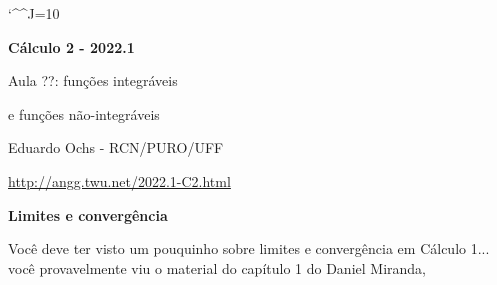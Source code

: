 \documentclass[oneside,12pt]{article}
\begin{document}
\catcode`\^^J=10
\pu
\def\pictgridstyle{\color{GrayPale}\linethickness{0.3pt}}
\def\pictaxesstyle{\linethickness{0.5pt}}


\def\u#1{\par{\footnotesize \url{#1}}}

\def\drafturl{http://angg.twu.net/LATEX/2022-1-C2.pdf}
\def\drafturl{http://angg.twu.net/2022.1-C2.html}
\def\draftfooter{\tiny \href{\drafturl}{\jobname{}} \ColorBrown{\shorttoday{} \hours}}



%

\thispagestyle{empty}

\begin{center}

\vspace*{1.2cm}

{\bf \Large Cálculo 2 - 2022.1}

\bsk

Aula ??: funções integráveis

e funções não-integráveis

\bsk

Eduardo Ochs - RCN/PURO/UFF

\url{http://angg.twu.net/2022.1-C2.html}

\end{center}

\newpage


{\bf Limites e convergência}

Você deve ter visto um pouquinho sobre limites e convergência em
Cálculo 1... você provavelmente viu o material do capítulo 1 do Daniel
Miranda,

\ssk
\end{document}
